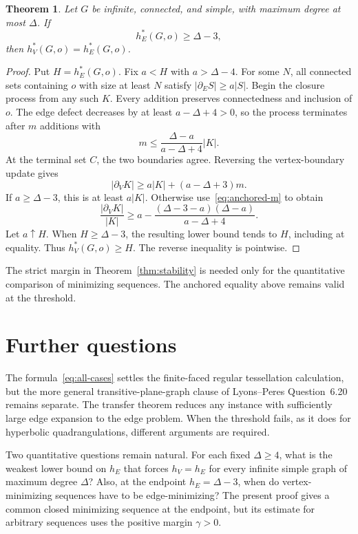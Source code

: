 \documentclass[11pt]{amsart}
\numberwithin{equation}{section}
\newtheorem{theorem}{Theorem}[section]
\theoremstyle{definition}
\theoremstyle{remark}
\newcommand{\hE}{h_E}
\newcommand{\hV}{h_V}
\newcommand{\bE}{\partial_E}
\newcommand{\bV}{\partial_V}
\begin{document}
\begin{theorem}\label{thm:anchored}
Let $G$ be infinite, connected, and simple, with maximum degree at most $\Delta$. If
\[
\hE^*(G,o)\ge\Delta-3,
\]
then $\hV^*(G,o)=\hE^*(G,o)$.
\end{theorem}
\begin{proof}
Put $H=\hE^*(G,o)$. Fix $a<H$ with $a>\Delta-4$. For some $N$, all connected sets containing $o$ with size at least $N$ satisfy $|\bE S|\ge a|S|$. Begin the closure process from any such $K$. Every addition preserves connectedness and inclusion of $o$. The edge defect decreases by at least $a-\Delta+4>0$, so the process terminates after $m$ additions with
\begin{equation}\label{eq:anchored-m}
m\le\frac{\Delta-a}{a-\Delta+4}|K|.
\end{equation}
At the terminal set $C$, the two boundaries agree. Reversing the vertex-boundary update gives
\[
|\bV K|\ge a|K|+(a-\Delta+3)m.
\]
If $a\ge\Delta-3$, this is at least $a|K|$. Otherwise use~\eqref{eq:anchored-m} to obtain
\[
\frac{|\bV K|}{|K|}
\ge a-\frac{(\Delta-3-a)(\Delta-a)}{a-\Delta+4}.
\]
Let $a\uparrow H$. When $H\ge\Delta-3$, the resulting lower bound tends to $H$, including at equality. Thus $\hV^*(G,o)\ge H$. The reverse inequality is pointwise.
\end{proof}

The strict margin in Theorem~\ref{thm:stability} is needed only for the quantitative comparison of minimizing sequences. The anchored equality above remains valid at the threshold.

\section{Further questions}
The formula~\eqref{eq:all-cases} settles the finite-faced regular tessellation calculation, but the more general transitive-plane-graph clause of Lyons--Peres Question~6.20 remains separate. The transfer theorem reduces any instance with sufficiently large edge expansion to the edge problem. When the threshold fails, as it does for hyperbolic quadrangulations, different arguments are required.

Two quantitative questions remain natural. For each fixed $\Delta\ge4$, what is the weakest lower bound on $\hE$ that forces $\hV=\hE$ for every infinite simple graph of maximum degree $\Delta$? Also, at the endpoint $\hE=\Delta-3$, when do vertex-minimizing sequences have to be edge-minimizing? The present proof gives a common closed minimizing sequence at the endpoint, but its estimate for arbitrary sequences uses the positive margin $\gamma>0$.
\end{document}
